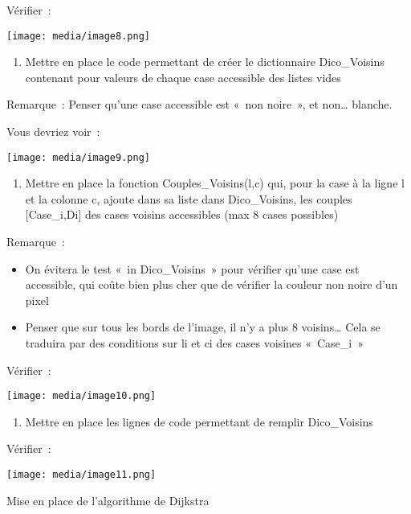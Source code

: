 \documentclass[
]{article}
\begin{document}
Vérifier~:

\texttt{[image: media/image8.png]}

\begin{enumerate}
\def\labelenumi{\arabic{enumi}.}
\setcounter{enumi}{1}
\item
  Mettre en place le code permettant de créer le dictionnaire
  Dico\_Voisins contenant pour valeurs de chaque case accessible des
  listes vides
\end{enumerate}

Remarque~: Penser qu'une case accessible est «~non noire~», et
non\ldots{} blanche.

Vous devriez voir~:

\texttt{[image: media/image9.png]}

\begin{enumerate}
\def\labelenumi{\arabic{enumi}.}
\setcounter{enumi}{2}
\item
  Mettre en place la fonction Couples\_Voisins(l,c) qui, pour la case à
  la ligne l et la colonne c, ajoute dans sa liste dans Dico\_Voisins,
  les couples {[}Case\_i,Di{]} des cases voisins accessibles (max 8
  cases possibles)
\end{enumerate}

Remarque~:

\begin{itemize}
\item
  On évitera le test «~in Dico\_Voisins~» pour vérifier qu'une case est
  accessible, qui coûte bien plus cher que de vérifier la couleur non
  noire d'un pixel
\item
  Penser que sur tous les bords de l'image, il n'y a plus 8
  voisins\ldots{} Cela se traduira par des conditions sur li et ci des
  cases voisines «~Case\_i~»
\end{itemize}

Vérifier~:

\texttt{[image: media/image10.png]}

\begin{enumerate}
\def\labelenumi{\arabic{enumi}.}
\item
  Mettre en place les lignes de code permettant de remplir Dico\_Voisins
\end{enumerate}

Vérifier~:

\texttt{[image: media/image11.png]}

Mise en place de l'algorithme de Dijkstra
\end{document}
